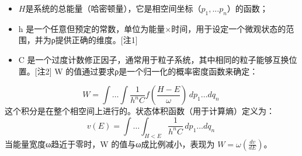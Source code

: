 \begin{itemize}
\item \(H\)是系统的总能量（哈密顿量），它是相空间坐标（\(p_1, ... p_n\)）的函数；  
\item h 是一个任意但预定的常数，单位为能量×时间，用于设定一个微观状态的范围，并为ρ提供正确的维度。[注1]  
\item C 是一个过度计数修正因子，通常用于粒子系统，其中相同的粒子能够互换位置。[注2]  
W 的值通过要求ρ是一个归一化的概率密度函数来确定：
\end{itemize}

\[
W = \int \ldots \int \frac{1}{h^n C} f\left(\frac{H - E}{\omega}\right) \, dp_1 \ldots dq_n~
\]
这个积分是在整个相空间上进行的。状态体积函数（用于计算熵）定义为：
\[
v(E) = \int \ldots \int_{H < E} \frac{1}{h^n C} \, dp_1 \ldots dq_n~
\]
当能量宽度ω趋近于零时，W 的值与ω成比例减小，表现为 \( W = \omega \left(\frac{dv}{dE}\right) \)。